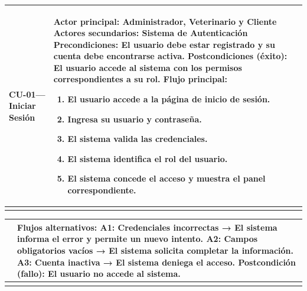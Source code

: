 \documentclass[
]{article}
\newcounter{none} %
\begin{document}
{\def\LTcaptype{none} %
\begin{longtable}[]{@{}
  >{\raggedright\arraybackslash}p{}
  >{\raggedright\arraybackslash}p{}@{}}
\toprule\noalign{}
\begin{minipage}[b]{\linewidth}\raggedright
CU-01--- Iniciar Sesión
\end{minipage} & \begin{minipage}[b]{\linewidth}\raggedright
\textbf{Actor principal:} Administrador, Veterinario y Cliente \textbf{Actores secundarios:} Sistema de Autenticación
\textbf{Precondiciones:} El usuario debe estar registrado y su cuenta
debe encontrarse activa. \textbf{Postcondiciones (éxito):} El usuario accede al sistema con los
permisos correspondientes a su rol. \textbf{Flujo principal:}

\begin{enumerate}
\def\labelenumi{\arabic{enumi}.}
\item
  El usuario accede a la página de inicio de sesión.
\item
  Ingresa su usuario y contraseña.
\item
  El sistema valida las credenciales.
\item
  El sistema identifica el rol del usuario.
\item
  El sistema concede el acceso y muestra el panel correspondiente.
\end{enumerate}
\end{minipage} \\
\midrule\noalign{}
\endhead
\bottomrule\noalign{}
\endlastfoot
\end{longtable}
}

{\def\LTcaptype{none} %
\begin{longtable}[]{@{}
  >{\raggedright\arraybackslash}p{}
  >{\raggedright\arraybackslash}p{}@{}}
\toprule\noalign{}
\begin{minipage}[b]{\linewidth}\raggedright
\end{minipage} & \begin{minipage}[b]{\linewidth}\raggedright
\textbf{Flujos alternativos:} A1: Credenciales incorrectas → El sistema informa el error y permite un nuevo intento. A2: Campos obligatorios vacíos → El sistema solicita completar la
información. A3: Cuenta inactiva → El sistema deniega el acceso.
\textbf{Postcondición (fallo):} El usuario no accede al sistema.
\end{minipage} \\
\midrule\noalign{}
\endhead
\bottomrule\noalign{}
\endlastfoot
\end{longtable}
}
\end{document}
